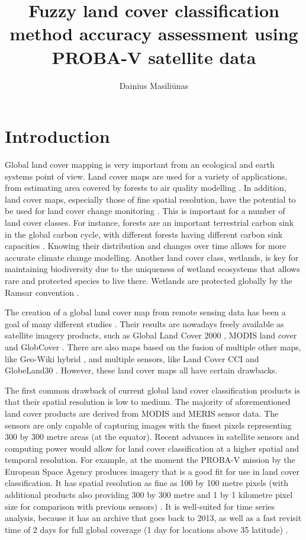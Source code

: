 \documentclass[a4paper,10pt]{article}
\title{Fuzzy land cover classification method accuracy assessment using PROBA-V satellite data}
\author{Dainius Masili\=unas}
\begin{document}
\maketitle

\section{Introduction}

Global land cover mapping is very important from an ecological and earth systems point of view. Land cover maps are used for a variety of applications, from estimating area covered by forests \citep{bartalev2014probavboreal} to air quality modelling \citep{wiedinmyer2006airquality}. In addition, land cover maps, especially those of fine spatial resolution, have the potential to be used for land cover change monitoring \citep{defourny2012cci}. This is important for a number of land cover classes. For instance, forests are an important terrestrial carbon sink in the global carbon cycle, with different forests having different carbon sink capacities \citep{pan2011large}. Knowing their distribution and changes over time allows for more accurate climate change modelling. Another land cover class, wetlands, is key for maintaining biodiversity due to the uniqueness of wetland ecosystems that allows rare and protected species to live there. Wetlands are protected globally by the Ramsar convention \citep{davis1994ramsar}.

The creation of a global land cover map from remote sensing data has been a goal of many different studies \citep{hansen2000hardtree}. Their results are nowadays freely available as satellite imagery products, such as Global Land Cover 2000 \citep{bartholome2005glc2000}, MODIS land cover \citep{friedl2010modis} and GlobCover \citep{arino2007globcover}. There are also maps based on the fusion of multiple other maps, like Geo-Wiki hybrid \citep{see2015hybrid}, and multiple sensors, like Land Cover CCI \citep{lccciguide} and GlobeLand30 \citep{chen2015globeland30}. However, these land cover maps all have certain drawbacks.

The first common drawback of current global land cover classification products is that their spatial resolution is low to medium. The majority of aforementioned land cover products are derived from MODIS and MERIS sensor data. The sensors are only capable of capturing images with the finest pixels representing 300 by 300 metre areas (at the equator). Recent advances in satellite sensors and computing power would allow for land cover classification at a higher spatial and temporal resolution. For example, at the moment the PROBA-V mission by the European Space Agency produces imagery that is a good fit for use in land cover classification. It has spatial resolution as fine as 100 by 100 metre pixels (with additional products also providing 300 by 300 metre and 1 by 1 kilometre pixel size for comparison with previous sensors) \citep{probavguide}. It is well-suited for time series analysis, because it has an archive that goes back to 2013, as well as a fast revisit time of 2 days for full global coverage (1 day for locations above 35\textdegree{} latitude) \citep{dierckx2014probav}.
\end{document}
